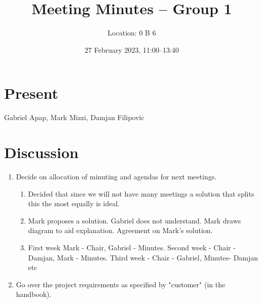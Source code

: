 \documentclass[11pt,a4paper]{scrartcl}
\title{Meeting Minutes -- Group 1}
\author{Location: 0 B 6}
\date{27 February 2023, 11:00--13:40}
\begin{document}
\maketitle

\section*{Present}
Gabriel Apap,
Mark Mizzi,
Damjan Filipovic

\section*{Discussion}

\begin{enumerate}



\item Decide on allocation of minuting and agendas for next meetings.
   \begin{enumerate}
   \item Decided that since we will not have many meetings a solution that splits this the most equally is ideal.
   \item Mark proposes a solution. Gabriel does not understand. Mark draws diagram to aid explanation. Agreement on Mark's solution.
   \item First week Mark - Chair, Gabriel - Minutes. Second week - Chair - Damjan, Mark - Minutes. Third week - Chair - Gabriel, Minutes- Damjan etc
   \end{enumerate}

\item Go over the project requirements as specified by "customer" (in the handbook).
   \begin{enumerate}

\end{enumerate}
\end{enumerate}
\end{document}
